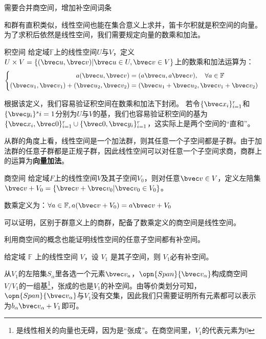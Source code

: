 

\begin{issues}
\issueTODO 需要合并商空间，增加补空间词条
\end{issues}


和群有直积类似，线性空间也能在集合意义上求并，笛卡尔积就是积空间的向量。为了求积后依然是线性空间，我们需要规定向量的数乘和加法。

\begin{definition}{积空间}
给定域$\mathbb F $上的线性空间$U$与$V$，定义$U\times V=\{(\bvec u,\bvec v)|\bvec u\in U,\bvec v\in V\}$上的数乘和加法运算为：
\begin{equation}
\left\{\begin{aligned}
a(\bvec u,\bvec v)&=(a\bvec u,a\bvec v),\quad \forall a\in \mathbb F\\
(\bvec u_1,\bvec v_1)+(\bvec u_2,\bvec v_2)&=(\bvec u_1+\bvec u_2,\bvec v_1+\bvec v_2)
\end{aligned}\right.~
\end{equation}
\end{definition}
根据该定义，我们容易验证积空间在数乘和加法下封闭。
若令$\{\bvec x_i\}^r_{i=1}$和$\{\bvec y_i\}^s{i=1}$分别为$U$与$V$的基，我们也容易验证积空间的基为$\{\bvec x_i,\bvec 0\}^r_{i=1}\cup \{\bvec 0,\bvec y_i\}^r_{i=1}$，这实际上是两个空间的“直和”。

从群的角度上看，线性空间是一个加法群，则其任意一个子空间都是子群。由于加法群的任意子群都是正规子群，因此线性空间可以对任意一个子空间求商，商群上的运算为\textbf{向量加法}。
\begin{definition}{商空间}
给定域$F$上的线性空间$V$及其子空间$V_0$，则对任意$\bvec v\in V$，定义左陪集$\bvec v+V_0=\{\bvec v+\bvec v_0|\bvec v_0\in V_0\}$。

数乘定义为：$\forall a\in \mathbb F,a(\bvec v+V_0)=a\bvec v+V_0$
\end{definition}
可以证明，区别于群意义上的商群，配备了数乘定义的商空间是线性空间。

利用商空间的概念也能证明线性空间的任意子空间都有补空间。
\begin{theorem}{}
给定域 $\mathbb F$ 上的线性空间 $V$，设 $V_1$ 是其子空间，则 $V_1$必有补空间。
\end{theorem}
从$V_1$的左陪集${S_{\alpha}}$里各选一个元素$\bvec v_a$，$\opn{Span} \{\bvec v_{\alpha}\}$构成商空间$V/V_1$的一组基\footnote{是线性相关的向量也无碍，因为是“张成”。在商空间里，$V_1$的代表元素为$0$}，张成的也是$V_1$的补空间。由等价类划分可知，$\opn{Span} \{\bvec v_{\alpha}\}$与$V_1$没有交集，因此我们只需要证明所有元素都可以表示为$b_{\alpha}\bvec v_{\alpha}+V_1$即可。

